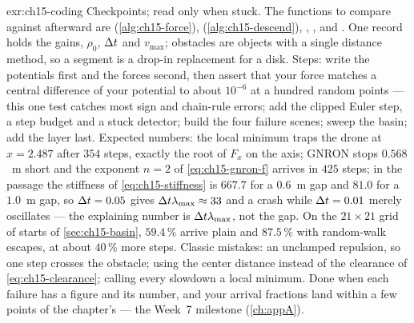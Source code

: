 \begin{solution}{exr:ch15-coding}
Checkpoints; read  only when stuck. The functions to
compare against afterward are  (\cref{alg:ch15-force}),
 (\cref{alg:ch15-descend}), ,
,  and . One
 record holds the gains, $\rho_0$, $\Delta t$ and $v_{\max}$; obstacles are
objects with a single distance method, so a segment is a drop-in replacement for a disk.
Steps: write the potentials first and the forces second, then assert that your force
matches a central difference of your potential to about $10^{-6}$ at a hundred random
points --- this one test catches most sign and chain-rule errors; add the clipped Euler
step, a step budget and a stuck detector; build the four failure scenes; sweep the basin;
add the \astar layer last. Expected numbers: the local minimum traps the drone at
$x=2.487$ after $354$ steps, exactly the root of $F_x$ on the axis; GNRON stops $0.568$~m
short and the exponent $n=2$ of \cref{eq:ch15-gnron-f} arrives in $425$ steps; in the
passage the stiffness of \cref{eq:ch15-stiffness} is $667.7$ for a $0.6$~m gap and $81.0$
for a $1.0$~m gap, so $\Delta t=0.05$ gives $\Delta t\lambda_{\max}\approx33$ and a crash while
$\Delta t=0.01$ merely oscillates --- the explaining number is $\Delta t\lambda_{\max}$, not the
gap. On the $21\times21$ grid of starts of \cref{sec:ch15-basin}, $59.4\,\%$ arrive plain
and $87.5\,\%$ with random-walk escapes, at about $40\,\%$ more steps. Classic mistakes:
an unclamped repulsion, so one step crosses the obstacle; using the center distance
instead of the clearance of \cref{eq:ch15-clearance}; calling every slowdown a local
minimum. Done when each failure has a figure and its number, and your arrival fractions
land within a few points of the chapter's --- the Week~7 milestone (\cref{ch:appA}).
\end{solution}
